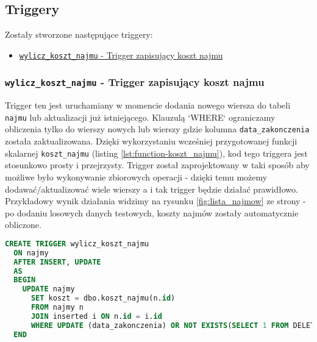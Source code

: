 \subsection{Triggery}

Zostały stworzone następujące triggery:
\begin{itemize}
	\item \href{run:Sources/SQL/5. Triggery/019_Utworzenie_triggeru_aktualizujacego_koszt_najmu.sql}{\texttt{wylicz\_koszt\_najmu} - Trigger zapisujący koszt najmu}
\end{itemize}

\subsubsection{\texttt{wylicz\_koszt\_najmu} - Trigger zapisujący koszt najmu}

Trigger ten jest uruchamiany w momencie dodania nowego wiersza do tabeli \texttt{najmu} lub aktualizacji już istniejącego. Klauzulą `WHERE` ograniczamy obliczenia tylko do wierszy nowych lub wierszy gdzie kolumna \texttt{data\_zakonczenia} została zaktualizowana. Dzięki wykorzystaniu wcześniej przygotowanej funkcji skalarnej \texttt{koszt\_najmu} (listing \ref{lst:function-koszt_najmu}), kod tego triggera jest stosunkowo prosty i przejrzysty. Trigger został zaprojektowany w taki sposób aby możliwe było wykonywanie zbiorowych operacji - dzięki temu możemy dodawać/aktualizować wiele wierszy a i tak trigger będzie działać prawidłowo. Przykładowy wynik działania widzimy na rysunku \ref{fig:lista_najmow} ze strony \pageref{fig:lista_najmow} - po dodaniu losowych danych testowych, koszty najmów zostały automatycznie obliczone.

\begin{lstlisting}[language=SQL, caption={Skrypt tworzący trigger \texttt{wylicz\_koszt\_najmu}}, label={lst:trigger-wylicz_koszt_najmu}]
CREATE TRIGGER wylicz_koszt_najmu
  ON najmy
  AFTER INSERT, UPDATE
  AS
  BEGIN
    UPDATE najmy
      SET koszt = dbo.koszt_najmu(n.id)
      FROM najmy n
      JOIN inserted i ON n.id = i.id
      WHERE UPDATE (data_zakonczenia) OR NOT EXISTS(SELECT 1 FROM DELETED)
  END
\end{lstlisting}